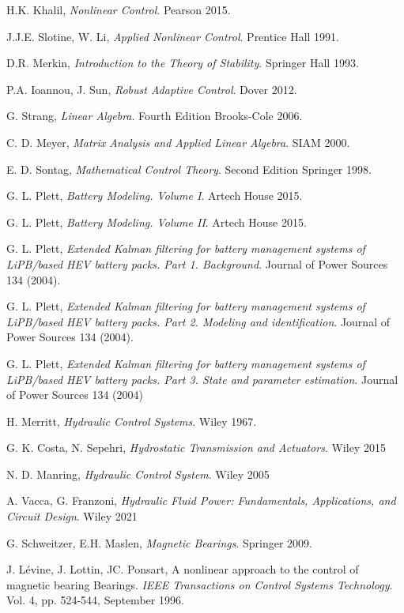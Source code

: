 \documentclass[11pt,a4paper,oneside]{book}
\numberwithin{equation}{section}
\theoremstyle{it}
\theoremstyle{definition}
\begin{document}
\begin{thebibliography}{99}
	H.K. Khalil, \emph{Nonlinear Control}. Pearson 2015.
	
	J.J.E. Slotine, W. Li,  \emph{Applied Nonlinear Control}. Prentice Hall 1991.

	D.R. Merkin,  \emph{Introduction to the Theory of Stability}. Springer Hall 1993.
	
	P.A. Ioannou, J. Sun,  \emph{Robust Adaptive Control}. Dover 2012.
	
	G. Strang,  \emph{Linear Algebra}. Fourth Edition Brooks-Cole 2006.
	
	C. D. Meyer, \emph{Matrix Analysis and Applied Linear Algebra}. SIAM 2000.
	
	E. D. Sontag,  \emph{Mathematical Control Theory}.  Second Edition Springer 1998.
	
	G. L. Plett,  \emph{Battery Modeling. Volume I}. Artech House 2015.
	
	G. L. Plett,  \emph{Battery Modeling. Volume II}. Artech House 2015.
	
	G. L. Plett,  \emph{Extended Kalman filtering for battery management systems of LiPB/based HEV battery packs. Part 1. Background}. Journal of Power Sources 134 (2004).
	
	G. L. Plett,  \emph{Extended Kalman filtering for battery management systems of LiPB/based HEV battery packs. Part 2. Modeling and identification}. Journal of Power Sources 134 (2004).	
	
	G. L. Plett,  \emph{Extended Kalman filtering for battery management systems of LiPB/based HEV battery packs. Part 3. State and parameter estimation}. Journal of Power Sources 134 (2004)	
	
	H. Merritt,  \emph{Hydraulic Control Systems}. Wiley 1967.
	
	G. K. Costa, N. Sepehri,  \emph{Hydrostatic Transmission and Actuators}. Wiley 2015
	
	N. D. Manring,  \emph{Hydraulic Control System}. Wiley 2005

	A. Vacca, G. Franzoni, \emph{Hydraulic Fluid Power: Fundamentals, Applications, and Circuit Design}. Wiley 2021

	G. Schweitzer, E.H. Maslen, \emph{Magnetic Bearings}. Springer 2009.
	
	J. Lévine, J. Lottin, JC. Ponsart, {A nonlinear approach to the control of magnetic bearing Bearings}. \emph{IEEE Transactions on Control Systems Technology}. Vol. 4, pp. 524-544, September 1996.
	
\end{thebibliography}


\end{document}
